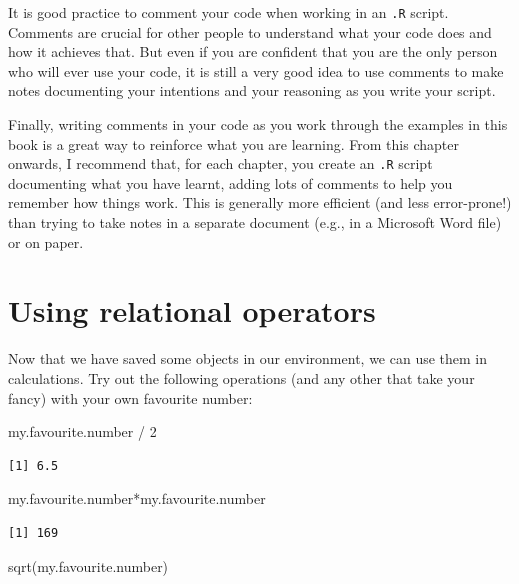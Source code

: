 \documentclass[
  letterpaper,
  DIV=11,
  numbers=noendperiod]{scrreprt}
\newenvironment{Shaded}{\begin{snugshade}}{\end{snugshade}}
\newcommand{\DecValTok}[1]{\textcolor[rgb]{0.68,0.00,0.00}{#1}}
\newcommand{\FunctionTok}[1]{\textcolor[rgb]{0.28,0.35,0.67}{#1}}
\newcommand{\NormalTok}[1]{\textcolor[rgb]{0.00,0.23,0.31}{#1}}
\newcommand{\SpecialCharTok}[1]{\textcolor[rgb]{0.37,0.37,0.37}{#1}}
\begin{document}
It is good practice to comment your code when working in an \texttt{.R}
script. Comments are crucial for other people to understand what your
code does and how it achieves that. But even if you are confident that
you are the only person who will ever use your code, it is still a very
good idea to use comments to make notes documenting your intentions and
your reasoning as you write your script.

Finally, writing comments in your code as you work through the examples
in this book is a great way to reinforce what you are learning. From
this chapter onwards, I recommend that, for each chapter, you create an
\texttt{.R} script documenting what you have learnt, adding lots of
comments to help you remember how things work. This is generally more
efficient (and less error-prone!) than trying to take notes in a
separate document (e.g., in a Microsoft Word file) or on paper.

\section{Using relational operators}\label{using-relational-operators}

Now that we have saved some objects in our environment, we can use them
in calculations. Try out the following operations (and any other that
take your fancy) with your own favourite number:

\begin{Shaded}
\begin{Highlighting}[]
\NormalTok{my.favourite.number }\SpecialCharTok{/} \DecValTok{2}
\end{Highlighting}
\end{Shaded}

\begin{verbatim}
[1] 6.5
\end{verbatim}

\begin{Shaded}
\begin{Highlighting}[]
\NormalTok{my.favourite.number}\SpecialCharTok{*}\NormalTok{my.favourite.number}
\end{Highlighting}
\end{Shaded}

\begin{verbatim}
[1] 169
\end{verbatim}

\begin{Shaded}
\begin{Highlighting}[]
\FunctionTok{sqrt}\NormalTok{(my.favourite.number)}
\end{Highlighting}
\end{Shaded}
\end{document}
